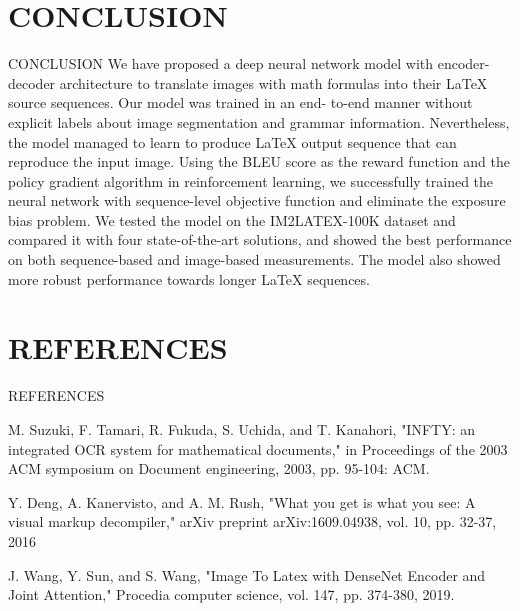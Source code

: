 \documentclass[svgnames,9pt]{beamer}
\begin{document}
\section{CONCLUSION}
\begin{frame}{ CONCLUSION }	
We have proposed a deep neural network model with encoder-
decoder architecture to translate images with math formulas into 
their LaTeX source sequences. Our model was trained in an end-
to-end manner without explicit labels about image segmentation 
and grammar information. Nevertheless, the model managed to 
learn to produce LaTeX output sequence that can reproduce the 
input image. Using the BLEU score as the reward function and 
the policy gradient algorithm in reinforcement learning, we 
successfully trained the neural network with sequence-level 
objective function and eliminate the exposure bias problem. We 
tested the model on the IM2LATEX-100K dataset and 
compared it with four state-of-the-art solutions, and showed the 
best performance on both sequence-based and image-based 
measurements. The model also showed more robust 
performance towards longer LaTeX sequences.

\end{frame}
\section{REFERENCES}
\begin{frame}{REFERENCES}
\begin{thebibliography}{99}
	 M. Suzuki, F. Tamari, R. Fukuda, S. Uchida, and T. 
Kanahori, "INFTY: an integrated OCR system for 
mathematical documents," in Proceedings of the 2003 ACM 
symposium on Document engineering, 2003, pp. 95-104: 
ACM. 

	
	
	Y. Deng, A. Kanervisto, and A. M. Rush, "What you get is 
what you see: A visual markup decompiler," arXiv preprint 
arXiv:1609.04938, vol. 10, pp. 32-37, 2016
	
	 J. Wang, Y. Sun, and S. Wang, "Image To Latex with 
DenseNet Encoder and Joint Attention," Procedia computer 
science, vol. 147, pp. 374-380, 2019.
\end{thebibliography}
\end{frame}
\end{document}

